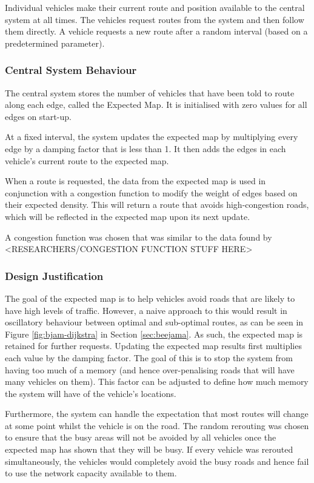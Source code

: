 \documentclass[ %
                    author={Alexander Hill},
                supervisor={Dr. Benjamin Sach},
                    degree={MEng},
                     title={MARMOSET},
                  subtitle={Multi-Agent Route Management using Online Simulation for Efficient Transportation},
                      type={research},
                      year={2016} ]{dissertation}
\begin{document}
Individual vehicles make their current route and position available to
the central system at all times. The vehicles request routes from the system and
then follow them directly. A vehicle requests a new route after a random
interval (based on a predetermined parameter).

\subsubsection{Central System Behaviour}

The central system stores the number of vehicles that have been told to route
along each edge, called the Expected Map. It is initialised with zero values for
all edges on start-up.

At a fixed interval, the system updates the expected map by multiplying every
edge by a damping factor that is less than 1. It then adds the edges in each
vehicle's current route to the expected map.

When a route is requested, the data from the expected map is used in conjunction
with a congestion function to modify the weight of edges based on their expected
density. This will return a route that avoids high-congestion roads, which will
be reflected in the expected map upon its next update.

A congestion function was chosen that was similar to the data found by
<RESEARCHERS/CONGESTION FUNCTION STUFF HERE>

\subsubsection{Design Justification}

The goal of the expected map is to help vehicles avoid roads that are likely to
have high levels of traffic. However, a naive approach to this would result in
oscillatory behaviour between optimal and sub-optimal routes, as can be seen in
Figure \ref{fig:bjam-dijkstra} in Section \ref{sec:beejama}. As such, the expected map
is retained for further requests. Updating the expected map results first
multiplies each value by the damping factor. The goal of this is to stop the
system from having too much of a memory (and hence over-penalising roads that
will have many vehicles on them). This factor can be adjusted to define how much memory
the system will have of the vehicle's locations.

Furthermore, the system can handle the expectation that most routes will
change at some point whilst the vehicle is on the road. The random rerouting was
chosen to ensure that the busy areas will not be avoided by all vehicles once the
expected map has shown that they will be busy. If every vehicle was rerouted
simultaneously, the vehicles would completely avoid the busy roads and hence
fail to use the network capacity available to them.
\end{document}
